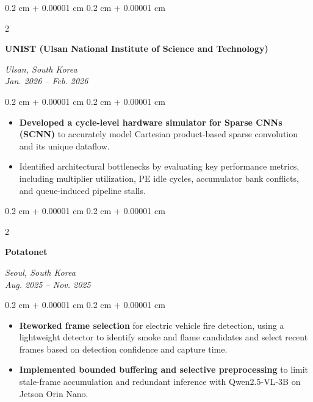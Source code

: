 \documentclass[10pt, letterpaper]{article}
\newenvironment{highlights}{
    \begin{itemize}[
        topsep=0.10 cm,
        parsep=0.10 cm,
        partopsep=0pt,
        itemsep=0pt,
        leftmargin=0.4 cm + 10pt
    ]
}{
    \end{itemize}
}
\newenvironment{onecolentry}{
    \begin{adjustwidth}{
        0.2 cm + 0.00001 cm
    }{
        0.2 cm + 0.00001 cm
    }
}{
    \end{adjustwidth}
}
\newenvironment{twocolentry}[2][]{
    \onecolentry
    \def\secondColumn{#2}
    \setcolumnwidth{\fill, 4.5 cm}
    \begin{paracol}{2}
}{
    \switchcolumn
    \raggedleft
    \secondColumn
    \end{paracol}
    \endonecolentry
}
\begin{document}
        \begin{twocolentry}{
            \textit{Ulsan, South Korea}
            \\
            \textit{Jan. 2026 -- Feb. 2026}
        }
            \textbf{UNIST (Ulsan National Institute of Science and Technology)}
            \\
        \end{twocolentry}

        \vspace{0.10 cm}

        \begin{onecolentry}
            \begin{highlights}
                \item \textbf{Developed a cycle-level hardware simulator
                for Sparse CNNs (SCNN)} to accurately model Cartesian
                product-based sparse convolution and its unique dataflow.

                \item Identified architectural bottlenecks by evaluating
                key performance metrics, including multiplier utilization,
                PE idle cycles, accumulator bank conflicts, and
                queue-induced pipeline stalls.
            \end{highlights}
        \end{onecolentry}

        \vspace{0.4 cm}

        \begin{twocolentry}{
            \textit{Seoul, South Korea}
            \\
            \textit{Aug. 2025 -- Nov. 2025}
        }
            \textbf{Potatonet}
            \\
        \end{twocolentry}

        \vspace{0.10 cm}

        \begin{onecolentry}
            \begin{highlights}
                \item \textbf{Reworked frame selection} for electric
                vehicle fire detection, using a lightweight detector
                to identify smoke and flame candidates and select
                recent frames based on detection confidence and
                capture time.

                \item \textbf{Implemented bounded buffering and
                selective preprocessing} to limit stale-frame
                accumulation and redundant inference with
                Qwen2.5-VL-3B on Jetson Orin Nano.
            \end{highlights}
        \end{onecolentry}
\end{document}
